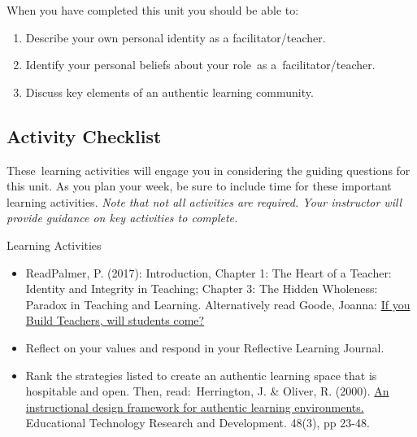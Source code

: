 \documentclass[
]{book}
\providecommand{\tightlist}{%
  \setlength{\itemsep}{0pt}\setlength{\parskip}{0pt}}
\begin{document}
When you have completed this unit you should be able to:

\begin{enumerate}
\def\labelenumi{\arabic{enumi}.}
\tightlist
\item
  Describe your own personal identity as a facilitator/teacher.\\
\item
  Identify your personal beliefs about your role~as a~facilitator/teacher.\\
\item
  Discuss key elements of an authentic learning community.
\end{enumerate}

\hypertarget{activity-checklist}{%
\subsection*{Activity Checklist}\label{activity-checklist}}

These~learning activities will engage you in considering the guiding questions for this unit. As you plan your week, be sure to include time for these important learning activities. \emph{Note that not all activities are required. Your instructor will provide guidance on key activities to complete.}

\begin{reflect}
{Learning Activities}

\begin{itemize}
\tightlist
\item
  ReadPalmer, P. (2017): Introduction, Chapter 1: The Heart of a
  Teacher: Identity and Integrity in Teaching; Chapter 3: The Hidden
  Wholeness: Paradox in Teaching and Learning. Alternatively read Goode,
  Joanna:
  \href{https://journals-sagepub-com.twu.idm.oclc.org/doi/pdf/10.2190/2102-5G77-QL77-5506}{If
  you Build Teachers, will students come?}\\
\item
  Reflect on your values and respond in your Reflective Learning
  Journal.\\
\item
  Rank the strategies listed to create an authentic learning space that
  is hospitable and open. Then, read:~Herrington, J. \& Oliver, R.
  (2000). \href{https://ro.uow.edu.au/edupapers/31/}{An instructional
  design framework for authentic learning environments.} Educational
  Technology Research and Development. 48(3), pp 23-48.
\end{itemize}
\end{reflect}
\end{document}
